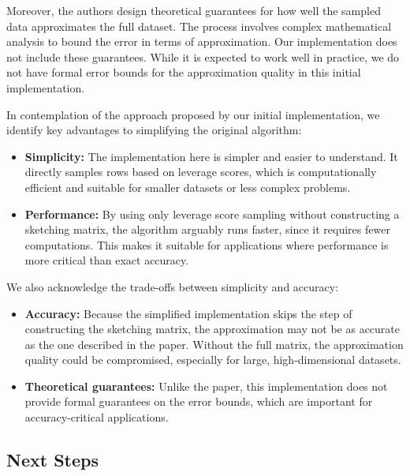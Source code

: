 \documentclass{article}
\theoremstyle{plain}
\theoremstyle{definition}
\theoremstyle{remark}
\begin{document}
Moreover, the authors design theoretical guarantees for how well the sampled data approximates the full dataset. The process involves complex mathematical analysis to bound the error in terms of approximation. Our implementation does not include these guarantees. While it is expected to work well in practice, we do not have formal error bounds for the approximation quality in this initial implementation.

In contemplation of the approach proposed by our initial implementation, we identify key advantages to simplifying the original algorithm:

\begin{itemize}

\item \textbf{Simplicity:} The implementation here is simpler and easier to understand. It directly samples rows based on leverage scores, which is computationally efficient and suitable for smaller datasets or less complex problems.

\item \textbf{Performance:} By using only leverage score sampling without constructing a sketching matrix, the algorithm arguably runs faster, since it requires fewer computations. This makes it suitable for applications where performance is more critical than exact accuracy.

\end{itemize}

We also acknowledge the trade-offs between simplicity and accuracy:

\begin{itemize}

\item \textbf{Accuracy:} Because the simplified implementation skips the step of constructing the sketching matrix, the approximation may not be as accurate as the one described in the paper. Without the full matrix, the approximation quality could be compromised, especially for large, high-dimensional datasets.

\item \textbf{Theoretical guarantees:} Unlike the paper, this implementation does not provide formal guarantees on the error bounds, which are important for accuracy-critical applications.

\end{itemize}


\subsection{Next Steps}
\end{document}
